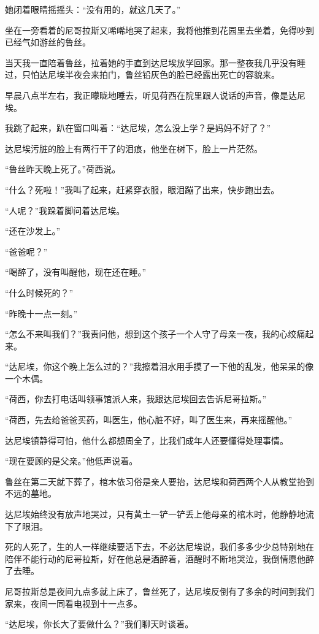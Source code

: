 \par 她闭着眼睛摇摇头：“没有用的，就这几天了。”
\par 坐在一旁看着的尼哥拉斯又唏唏地哭了起来，我将他推到花园里去坐着，免得吵到已经气如游丝的鲁丝。
\par 当天我一直陪着鲁丝，拉着她的手直到达尼埃放学回家。那一整夜我几乎没有睡过，只怕达尼埃半夜会来拍门，鲁丝铅灰色的脸已经露出死亡的容貌来。
\par 早晨八点半左右，我正矇眬地睡去，听见荷西在院里跟人说话的声音，像是达尼埃。
\par 我跳了起来，趴在窗口叫着：“达尼埃，怎么没上学？是妈妈不好了？”
\par 达尼埃污脏的脸上有两行干了的泪痕，他坐在树下，脸上一片茫然。
\par “鲁丝昨天晚上死了。”荷西说。
\par “什么？死啦！”我叫了起来，赶紧穿衣服，眼泪蹦了出来，快步跑出去。
\par “人呢？”我跺着脚问着达尼埃。
\par “还在沙发上。”
\par “爸爸呢？”
\par “喝醉了，没有叫醒他，现在还在睡。”
\par “什么时候死的？”
\par “昨晚十一点一刻。”
\par “怎么不来叫我们？”我责问他，想到这个孩子一个人守了母亲一夜，我的心绞痛起来。
\par “达尼埃，你这个晚上怎么过的？”我擦着泪水用手摸了一下他的乱发，他呆呆的像一个木偶。
\par “荷西，你去打电话叫领事馆派人来，我跟达尼埃回去告诉尼哥拉斯。”
\par “荷西，先去给爸爸买药，叫医生，他心脏不好，叫了医生来，再来摇醒他。”
\par 达尼埃镇静得可怕，他什么都想周全了，比我们成年人还要懂得处理事情。
\par “现在要顾的是父亲。”他低声说着。
\par 鲁丝在第二天就下葬了，棺木依习俗是亲人要抬，达尼埃和荷西两个人从教堂抬到不远的墓地。
\par 达尼埃始终没有放声地哭过，只有黄土一铲一铲丢上他母亲的棺木时，他静静地流下了眼泪。
\par 死的人死了，生的人一样继续要活下去，不必达尼埃说，我们多多少少总特别地在陪伴不能行动的尼哥拉斯，好在他总是酒醉着，酒醒时不断地哭泣，我倒情愿他醉了去睡。
\par 尼哥拉斯总是夜间九点多就上床了，鲁丝死了，达尼埃反倒有了多余的时间到我们家来，夜间一同看电视到十一点多。
\par “达尼埃，你长大了要做什么？”我们聊天时谈着。
